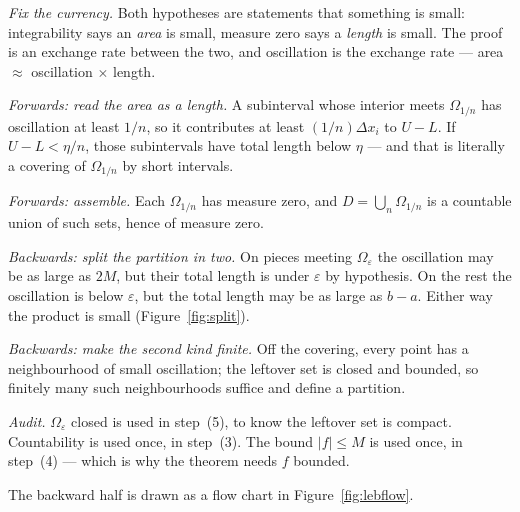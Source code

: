 \begin{flow}
  \item \textit{Fix the currency.} Both hypotheses are statements that
        something is small: integrability says an \emph{area} is small,
        measure zero says a \emph{length} is small. The proof is an exchange
        rate between the two, and oscillation is the exchange rate ---
        area $\approx$ oscillation $\times$ length.
  \item \textit{Forwards: read the area as a length.} A subinterval whose
        interior meets $\Omega_{1/n}$ has oscillation at least $1/n$, so it
        contributes at least $(1/n)\Delta x_i$ to $U-L$. If $U-L<\eta/n$,
        those subintervals have total length below $\eta$ --- and that is
        literally a covering of $\Omega_{1/n}$ by short intervals.
  \item \textit{Forwards: assemble.} Each $\Omega_{1/n}$ has measure zero,
        and $D = \bigcup_n \Omega_{1/n}$ is a countable union of such sets,
        hence of measure zero.
  \item \textit{Backwards: split the partition in two.} On pieces meeting
        $\Omega_\varepsilon$ the oscillation may be as large as $2M$, but
        their total length is under $\varepsilon$ by hypothesis. On the rest
        the oscillation is below $\varepsilon$, but the total length may be
        as large as $b-a$. Either way the product is small
        (Figure~\ref{fig:split}).
  \item \textit{Backwards: make the second kind finite.} Off the covering,
        every point has a neighbourhood of small oscillation; the leftover
        set is closed and bounded, so finitely many such neighbourhoods
        suffice and define a partition.
  \item \textit{Audit.} $\Omega_\varepsilon$ closed is used in step~(5), to
        know the leftover set is compact. Countability is used once, in
        step~(3). The bound $|f|\le M$ is used once, in step~(4) --- which is
        why the theorem needs $f$ bounded.
\end{flow}

The backward half is drawn as a flow chart in Figure~\ref{fig:lebflow}.

